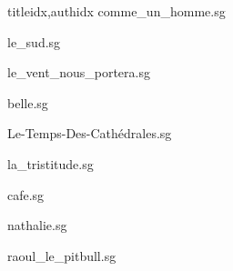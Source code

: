 \documentclass[12pt]{article}
\begin{document}
\begin{songs}{titleidx,authidx}
{comme_un_homme.sg}


{le_sud.sg}


{le_vent_nous_portera.sg}


{belle.sg}


{Le-Temps-Des-Cathédrales.sg}


{la_tristitude.sg}


{cafe.sg}


{nathalie.sg}


{raoul_le_pitbull.sg}



\end{songs}
\end{document}
